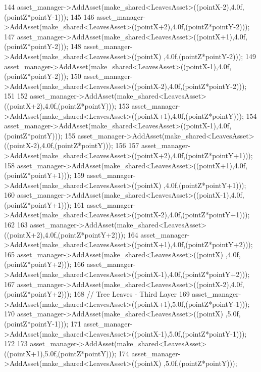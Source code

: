 \begin{DoxyCode}
144             asset\_manager->AddAsset(make\_shared<LeavesAsset>((pointX-2),4.0f,(pointZ*pointY-1)));
145  
146             asset\_manager->AddAsset(make\_shared<LeavesAsset>((pointX+2),4.0f,(pointZ*pointY-2)));
147             asset\_manager->AddAsset(make\_shared<LeavesAsset>((pointX+1),4.0f,(pointZ*pointY-2)));
148             asset\_manager->AddAsset(make\_shared<LeavesAsset>((pointX)  ,4.0f,(pointZ*pointY-2)));
149             asset\_manager->AddAsset(make\_shared<LeavesAsset>((pointX-1),4.0f,(pointZ*pointY-2)));
150             asset\_manager->AddAsset(make\_shared<LeavesAsset>((pointX-2),4.0f,(pointZ*pointY-2)));
151  
152             asset\_manager->AddAsset(make\_shared<LeavesAsset>((pointX+2),4.0f,(pointZ*pointY)));
153             asset\_manager->AddAsset(make\_shared<LeavesAsset>((pointX+1),4.0f,(pointZ*pointY)));
154             asset\_manager->AddAsset(make\_shared<LeavesAsset>((pointX-1),4.0f,(pointZ*pointY)));
155             asset\_manager->AddAsset(make\_shared<LeavesAsset>((pointX-2),4.0f,(pointZ*pointY)));
156  
157             asset\_manager->AddAsset(make\_shared<LeavesAsset>((pointX+2),4.0f,(pointZ*pointY+1)));
158             asset\_manager->AddAsset(make\_shared<LeavesAsset>((pointX+1),4.0f,(pointZ*pointY+1)));
159             asset\_manager->AddAsset(make\_shared<LeavesAsset>((pointX)  ,4.0f,(pointZ*pointY+1)));
160             asset\_manager->AddAsset(make\_shared<LeavesAsset>((pointX-1),4.0f,(pointZ*pointY+1)));
161             asset\_manager->AddAsset(make\_shared<LeavesAsset>((pointX-2),4.0f,(pointZ*pointY+1)));
162 
163             asset\_manager->AddAsset(make\_shared<LeavesAsset>((pointX+2),4.0f,(pointZ*pointY+2)));
164             asset\_manager->AddAsset(make\_shared<LeavesAsset>((pointX+1),4.0f,(pointZ*pointY+2)));
165             asset\_manager->AddAsset(make\_shared<LeavesAsset>((pointX)  ,4.0f,(pointZ*pointY+2)));
166             asset\_manager->AddAsset(make\_shared<LeavesAsset>((pointX-1),4.0f,(pointZ*pointY+2)));
167             asset\_manager->AddAsset(make\_shared<LeavesAsset>((pointX-2),4.0f,(pointZ*pointY+2)));
168             \textcolor{comment}{// Tree Leaves - Third Layer}
169             asset\_manager->AddAsset(make\_shared<LeavesAsset>((pointX+1),5.0f,(pointZ*pointY-1)));
170             asset\_manager->AddAsset(make\_shared<LeavesAsset>((pointX)  ,5.0f,(pointZ*pointY-1)));
171             asset\_manager->AddAsset(make\_shared<LeavesAsset>((pointX-1),5.0f,(pointZ*pointY-1))); 
172 
173             asset\_manager->AddAsset(make\_shared<LeavesAsset>((pointX+1),5.0f,(pointZ*pointY)));
174             asset\_manager->AddAsset(make\_shared<LeavesAsset>((pointX)  ,5.0f,(pointZ*pointY)));

\end{DoxyCode}
